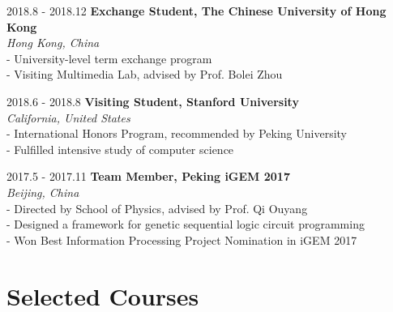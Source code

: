 \documentclass{academiccv}
\begin{document}
\begin{tablist}

\item[2018.8 - 2018.12] 	\tab \textbf {Exchange Student, The Chinese University of Hong Kong} \textbf
					\\ \tab \emph{Hong Kong, China}\emph
					\\ \tab - University-level term exchange program
				      \\ \tab - Visiting Multimedia Lab, advised by Prof. Bolei Zhou
				   

\item[2018.6 - 2018.8] 	\tab \textbf {Visiting Student, Stanford University} \textbf
					\\ \tab \emph{California, United States}\emph
				      \\ \tab - International Honors Program, recommended by Peking University
				     \\ \tab - Fulfilled intensive study of computer science
				     
\item[2017.5 - 2017.11] 	\tab \textbf {Team Member, Peking iGEM 2017} \textbf
					\\ \tab \emph{Beijing, China}\emph
					\\ \tab - Directed by School of Physics, advised by Prof. Qi Ouyang
				      \\ \tab - Designed a framework for genetic sequential logic circuit programming
				     \\ \tab - Won Best Information Processing Project Nomination in iGEM 2017		   
				     
				     
				     
				     				      
\end{tablist}

\section*{Selected Courses}
\end{document}
